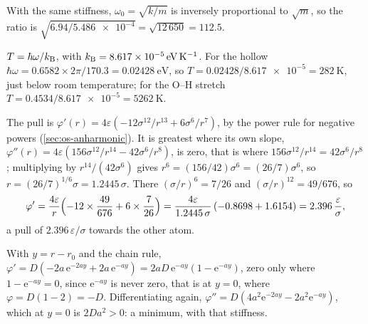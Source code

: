 \label{sec:pe-solutions}

With the same stiffness, $\omega_0 = \sqrt{k/m}$
is inversely proportional to $\sqrt{m}$, so the ratio is $\sqrt{6.94/
\num{5.486e-4}} = \sqrt{12\,650} = 112.5$.

$T = \hbar\omega/k_{\mathrm{B}}$, with $k_{\mathrm{B}} =
\SI{8.617e-5}{\electronvolt\per\kelvin}$. For the hollow $\hbar\omega =
0.6582\times2\pi/170.3 = \SI{0.02428}{\electronvolt}$, so $T =
0.02428/\num{8.617e-5} = \SI{282}{\kelvin}$, just below room
temperature; for the O--H stretch $T = 0.4534/\num{8.617e-5} =
\SI{5262}{\kelvin}$.

The pull is $\varphi'(r) = 4\varepsilon
(-12\sigma^{12}/r^{13} + 6\sigma^6/r^7)$, by the power rule for negative
powers (\cref{sec:os-anharmonic}). It is greatest where its own slope,
$\varphi''(r) = 4\varepsilon(156\sigma^{12}/r^{14} - 42\sigma^6/r^8)$, is
zero, that is where $156\sigma^{12}/r^{14} = 42\sigma^6/r^8$; multiplying
by $r^{14}/(42\sigma^6)$ gives $r^6 = (156/42)\sigma^6 = (26/7)\sigma^6$,
so $r = (26/7)^{1/6}\sigma = 1.2445\,\sigma$. There $(\sigma/r)^6 = 7/26$
and $(\sigma/r)^{12} = 49/676$, so
\begin{equation*}
   \varphi' = \frac{4\varepsilon}{r}\Bigl(-12\times\frac{49}{676}
   + 6\times\frac{7}{26}\Bigr) = \frac{4\varepsilon}{1.2445\,\sigma}\,
   (-0.8698 + 1.6154) = 2.396\,\frac{\varepsilon}{\sigma} ,
\end{equation*}
a pull of $2.396\,\varepsilon/\sigma$ towards the other atom.

With $y = r - r_0$ and the chain rule, $\varphi'
= D(-2a\,\mathrm{e}^{-2ay} + 2a\,\mathrm{e}^{-ay}) = 2aD\,\mathrm{e}^{-ay}
(1 - \mathrm{e}^{-ay})$, zero only where $1 - \mathrm{e}^{-ay} = 0$, since $\mathrm{e}^{-ay}$ is
never zero, that is at $y = 0$, where $\varphi = D(1 - 2) = -D$. Differentiating again, $\varphi'' =
D(4a^2\mathrm{e}^{-2ay} - 2a^2\mathrm{e}^{-ay})$, which at $y = 0$ is
$2Da^2 > 0$: a minimum, with that stiffness.

